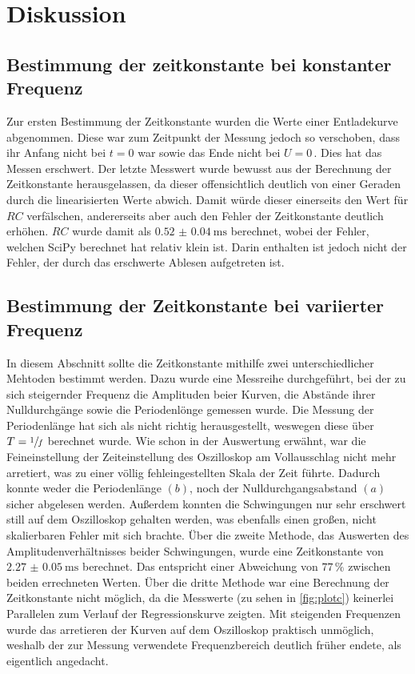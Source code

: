 \section{Diskussion}
\label{sec:Diskussion}
\subsection{Bestimmung der zeitkonstante bei konstanter Frequenz}
Zur ersten Bestimmung der Zeitkonstante wurden die Werte einer Entladekurve abgenommen.
Diese war zum Zeitpunkt der Messung jedoch so verschoben, dass ihr Anfang nicht bei $t=0$
war sowie das Ende nicht bei $U=0$\,. Dies hat das Messen erschwert. Der letzte Messwert
wurde bewusst aus der Berechnung der Zeitkonstante herausgelassen, da dieser offensichtlich 
deutlich von einer Geraden durch die linearisierten Werte abwich. Damit würde dieser einerseits
den Wert für $RC$ verfälschen, andererseits aber auch den Fehler der Zeitkonstante deutlich
erhöhen. $RC$ wurde damit als $\qty{0,52(0.04)}{\milli\second}$ berechnet, wobei der Fehler,
welchen SciPy berechnet hat relativ klein ist. Darin enthalten ist jedoch nicht der Fehler, der 
durch das erschwerte Ablesen aufgetreten ist. 
\subsection{Bestimmung der Zeitkonstante bei variierter Frequenz}
In diesem Abschnitt sollte die Zeitkonstante mithilfe zwei unterschiedlicher Mehtoden bestimmt werden.
Dazu wurde eine Messreihe durchgeführt, bei der zu sich steigernder Frequenz die Amplituden beier Kurven,
die Abstände ihrer Nulldurchgänge sowie die Periodenlönge gemessen wurde. Die Messung der Periodenlänge 
hat sich als nicht richtig herausgestellt, weswegen diese über $T=\sfrac{1}{f}$ berechnet wurde.
Wie schon in der Auswertung erwähnt, war die Feineinstellung der Zeiteinstellung des Oszilloskop am 
Vollausschlag nicht mehr arretiert, was zu einer völlig fehleingestellten Skala der Zeit führte. Dadurch 
konnte weder die Periodenlänge $(b)$, noch der Nulldurchgangsabstand $(a)$ sicher abgelesen werden. 
Außerdem konnten die Schwingungen nur sehr erschwert still auf dem Oszilloskop gehalten werden, was
ebenfalls einen großen, nicht skalierbaren Fehler mit sich brachte. 
Über die zweite Methode, das Auswerten des Amplitudenverhältnisses beider Schwingungen, wurde eine 
Zeitkonstante von $\qty{2,27(0.05)}{\milli\second}$ berechnet. Das entspricht einer Abweichung von
$77\,\%$ zwischen beiden errechneten Werten. Über die dritte Methode war eine Berechnung der Zeitkonstante 
nicht möglich, da die Messwerte (zu sehen in \autoref{fig:plotc}) keinerlei Parallelen zum Verlauf der 
Regressionskurve zeigten. 
Mit steigenden Frequenzen wurde das arretieren der Kurven auf dem Oszilloskop praktisch unmöglich, weshalb
der zur Messung verwendete Frequenzbereich deutlich früher endete, als eigentlich angedacht.
